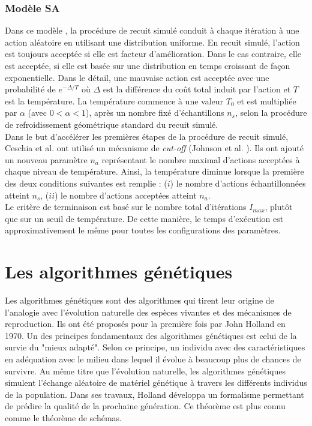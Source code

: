 		\subsubsection{Modèle SA}
		Dans ce modèle \cite{ceschia}, la procédure de recuit simulé conduit à chaque itération à une action aléatoire en utilisant une distribution uniforme. En recuit simulé, l'action est toujours acceptée si elle est facteur d'amélioration. Dans le cas contraire, elle est acceptée, si elle est basée sur une distribution en temps croissant de façon exponentielle. Dans le détail, une mauvaise action est acceptée avec une probabilité de $e^{-\Delta/T}$ où $\Delta$ est la différence du coût total induit par l'action et $T$ est la température. La température commence à une valeur $T_{0}$ et est multipliée par $\alpha$ (avec $0 < \alpha < 1$), après un nombre fixé d'échantillons $n_{s}$, selon la procédure de refroidissement géométrique standard du recuit simulé. \\
		\hspace*{.5cm} Dans le but d'accélérer les premières étapes de la procédure de recuit simulé,  Ceschia et al. ont utilisé un mécanisme de \emph{cut-off} (Johnson et al. \cite{johnson}). Ils ont ajouté un nouveau paramètre $n_{a}$ représentant le nombre maximal d'actions acceptées à chaque niveau de température. Ainsi, la température diminue lorsque la première des deux conditions suivantes est remplie : ($i$) le nombre d'actions échantillonnées atteint $n_{s}$, ($ii$) le nombre d'actions acceptées atteint $n_{a}$. \\
		\hspace*{.5cm} Le critère de terminaison est basé sur le nombre total d'itérations $I_{max}$, plutôt que sur un seuil de température. De cette manière, le temps d'exécution est approximativement le même pour toutes les configurations des paramètres.
		
	\section{Les algorithmes génétiques}
		
	Les algorithmes génétiques sont des algorithmes qui tirent leur origine de l'analogie avec l'évolution naturelle des espèces vivantes et des mécanismes de reproduction. Ils ont été proposés pour la première fois par John Holland \cite{holland1} en 1970. Un des principes fondamentaux des algorithmes génétiques est celui de la survie du "mieux adapté". Selon ce principe, un individu avec des caractéristiques en adéquation avec le milieu dans lequel il évolue à beaucoup plus de chances de survivre. Au même titre que l'évolution naturelle, les algorithmes génétiques simulent l'échange aléatoire de matériel génétique à travers les différents individus de la population. Dans ses travaux, Holland développa un formalisme permettant de prédire la qualité de la prochaine génération. Ce théorème est plus connu comme le théorème de schémas.  
	
